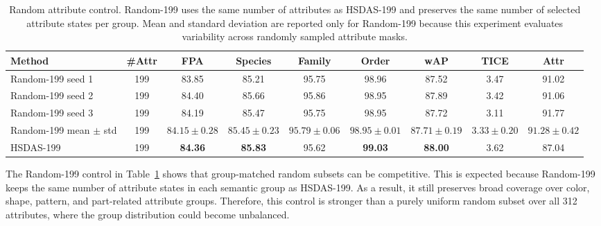 \begin{table}[t]
    \centering
    \caption{Random attribute control. Random-199 uses the same number of attributes as HSDAS-199 and preserves the same number of selected attribute states per group. Mean and standard deviation are reported only for Random-199 because this experiment evaluates variability across randomly sampled attribute masks.}
    \label{tab:random_control}
    \scriptsize
    \setlength{\tabcolsep}{3pt}
    \renewcommand{\arraystretch}{1.12}
    \begin{adjustbox}{max width=\textwidth}
    \begin{tabular}{@{}lcccccccc@{}}
        \hline
        \textbf{Method} & \textbf{\#Attr} & \textbf{FPA} & \textbf{Species} & \textbf{Family} & \textbf{Order} & \textbf{wAP} & \textbf{TICE} & \textbf{Attr} \\
        \hline
        Random-199 seed 1 
        & 199 & 83.85 & 85.21 & 95.75 & 98.96 & 87.52 & 3.47 & 91.02 \\
        Random-199 seed 2 
        & 199 & 84.40 & 85.66 & 95.86 & 98.95 & 87.89 & 3.42 & 91.06 \\
        Random-199 seed 3 
        & 199 & 84.19 & 85.47 & 95.75 & 98.95 & 87.72 & 3.11 & 91.77 \\
        \makecell[l]{Random-199\\mean \(\pm\) std}
        & 199 
        & \(84.15 \pm 0.28\)
        & \(85.45 \pm 0.23\)
        & \(95.79 \pm 0.06\)
        & \(98.95 \pm 0.01\)
        & \(87.71 \pm 0.19\)
        & \(3.33 \pm 0.20\)
        & \(91.28 \pm 0.42\) \\
        HSDAS-199 
        & 199 & \textbf{84.36} & \textbf{85.83} & 95.62 & \textbf{99.03} & \textbf{88.00} & 3.62 & 87.04 \\
        \hline
    \end{tabular}
    \end{adjustbox}
\end{table}

The Random-199 control in Table~\ref{tab:random_control} shows that group-matched random subsets can be competitive. This is expected because Random-199 keeps the same number of attribute states in each semantic group as HSDAS-199. As a result, it still preserves broad coverage over color, shape, pattern, and part-related attribute groups. Therefore, this control is stronger than a purely uniform random subset over all 312 attributes, where the group distribution could become unbalanced.

